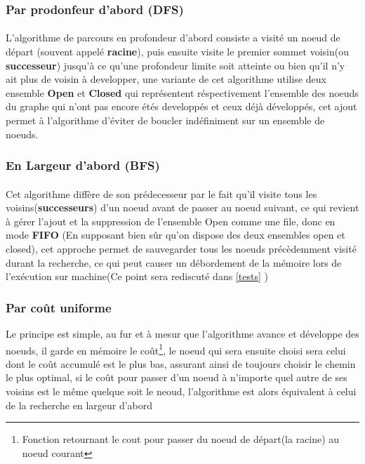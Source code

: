 \subsubsection{Par prodonfeur d'abord (DFS)}
\paragraph{}
L'algorithme de parcours en profondeur d'abord consiste a visité un noeud de départ (souvent appelé \textbf{racine}), puis ensuite visite le premier sommet voisin(ou \textbf{successeur}) jusqu'à ce qu'une profondeur limite soit atteinte ou bien qu'il n'y ait plus de voisin à developper, une variante de cet algorithme utilise deux ensemble \textbf{Open} et \textbf{Closed} qui représentent réspectivement l'ensemble des noeuds du graphe qui n'ont pas encore étés developpés et ceux déjà développés, cet ajout permet à l'algorithme d'éviter de boucler indéfiniment sur un ensemble de noeuds.
\subsubsection{En Largeur d'abord (BFS)}
\paragraph{}
Cet algorithme diffère de son prédecesseur par le fait qu'il visite tous les voisins(\textbf{successeurs}) d'un noeud avant de passer au noeud suivant, ce qui revient à gérer l'ajout et la suppression de l'ensemble Open comme une file, donc en mode \textbf{FIFO} (En supposant bien sûr qu'on dispose des deux ensembles open et closed), cet approche permet de sauvegarder tous les noeuds précèdemment visité durant la recherche, ce qui peut causer un débordement de la mémoire lors de l'exécution sur machine(Ce point sera rediscuté dans \ref{tests} )

\subsubsection{Par coût uniforme}
Le principe est simple, au fur et à mesur que l'algorithme avance et développe des noeuds, il garde en mémoire le coût\footnote[1]{Fonction retournant le cout pour passer du noeud de départ(la racine) au noeud courant}, le noeud qui sera ensuite choisi sera celui dont le coût accumulé est le plus bas, assurant ainsi de toujours choisir le chemin le plus optimal, si le coût pour passer d'un noeud à n'importe quel autre de ses voisins est le même quelque soit le neoud, l'algorithme est alors équivalent à celui de la recherche en largeur d'abord
